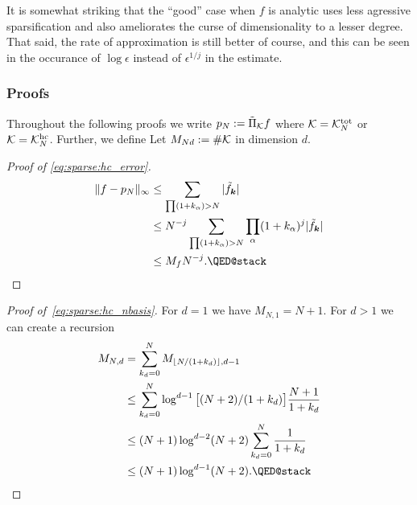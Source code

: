 
It is somewhat striking that the ``good'' case when $f$ is analytic uses less
agressive sparsification and also ameliorates the curse of dimensionality to a
lesser degree. That said, the rate of approximation is still better of course,
and this can be seen in the occurance of $\log \epsilon$ instead of
$\epsilon^{1/j}$ in the estimate.

\subsubsection{Proofs}

Throughout the following proofs we write $p_N := \tilde\Pi_{\mathcal{K}}f$ where
$\mathcal{K} = \mathcal{K}_N^{\rm tot}$ or $\mathcal{K} = \mathcal{K}_N^{\rm hc}$. Further, we define Let
$M_{Nd} := \#\mathcal{K}$ in dimension $d$.

\begin{proof}[Proof of \eqref{eq:sparse:hc_error}]
    \begin{align*}
        \|f - p_N\|_\infty
        &\leq
        \sum_{\prod (1+k_\alpha)>N} |\tilde{f}_\bk| \\
        &\leq
        N^{-j}
        \sum_{\prod (1+k_\alpha)>N}  \prod_\alpha (1+k_\alpha)^j |\tilde{f}_\bk| \\
        &\leq
        M_f N^{-j}. \qedhere
    \end{align*}
\end{proof}

\begin{proof}[Proof of~\eqref{eq:sparse:hc_nbasis}]
    For $d = 1$ we have $M_{N,1} = N+1$. For $d > 1$ we can create a
    recursion
    \begin{align*}
        M_{N,d}
        &= \sum_{k_{d} = 0}^N M_{\lfloor N/(1+k_d) \rfloor, d-1} \\
        &\leq \sum_{k_d = 0}^N \log^{d-1} \b[ (N+2)/(1+k_d) \b] \frac{N+1}{1+k_d} \\
        &\leq (N+1) \log^{d-2} (N+2) \sum_{k_d = 0}^N \frac{1}{1+k_d} \\
        &\leq (N+1) \log^{d-1} (N+2).  \qedhere
    \end{align*}
\end{proof}

